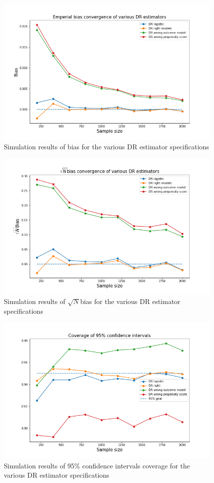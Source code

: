 \documentclass[12pt,twoside]{article}
\begin{document}
\begin{figure}[h!]
    \centering
    \includegraphics[width = 0.9\columnwidth]{figures/biaspara.png}
    \caption{Simulation results of bias for the various DR estimator specifications}
    \label{figbiaspara}
\end{figure}

\begin{figure}[h!]
    \centering
    \includegraphics[width = 0.9\columnwidth]{figures/sqrtnpara.png}
    \caption{Simulation results of $\sqrt{N}$bias for the various DR estimator specifications}
    \label{figsqrtnpara}
\end{figure}

\begin{figure}[h!]
    \centering
    \includegraphics[width = 0.9\columnwidth]{figures/CIpara.png}
    \caption{Simulation results of 95\% confidence intervals coverage for the various DR estimator specifications}
    \label{figCIpara}
\end{figure}
\end{document}
